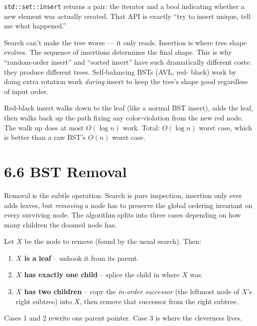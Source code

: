 \documentclass[11pt]{article}
\begin{document}
\texttt{std::set::insert} returns a pair: the iterator and a
bool indicating whether a new element was actually created.
That API is exactly ``try to insert unique, tell me what
happened.''

\begin{ideabox}
Search can't make the tree worse --- it only reads. Insertion
is where tree shape evolves. The sequence of insertions
determines the final shape. This is why ``random-order insert''
and ``sorted insert'' have such dramatically different costs:
they produce different trees. Self-balancing BSTs (AVL, red-
black) work by doing extra rotation work \emph{during} insert
to keep the tree's shape good regardless of input order.
\end{ideabox}

\begin{notebox}
Red-black insert walks down to the leaf (like a normal BST
insert), adds the leaf, then walks back up the path fixing any
color-violation from the new red node. The walk up does at most
$O(\log n)$ work. Total: $O(\log n)$ worst case, which is
better than a raw BST's $O(n)$ worst case.
\end{notebox}

\section{6.6 BST Removal}

Removal is the subtle operation. Search is pure inspection, insertion only ever adds leaves, but \emph{removing} a node has to preserve the global ordering invariant on every surviving node. The algorithm splits into three cases depending on how many children the doomed node has.

\begin{defnbox}
Let $X$ be the node to remove (found by the usual search). Then:
\begin{enumerate}[leftmargin=*]
    \item \textbf{$X$ is a leaf} -- unhook it from its parent.
    \item \textbf{$X$ has exactly one child} -- splice the child in where $X$ was.
    \item \textbf{$X$ has two children} -- copy the \emph{in-order successor} (the leftmost node of $X$'s right subtree) into $X$, then remove that successor from the right subtree.
\end{enumerate}
Cases 1 and 2 rewrite one parent pointer. Case 3 is where the cleverness lives.
\end{defnbox}
\end{document}
